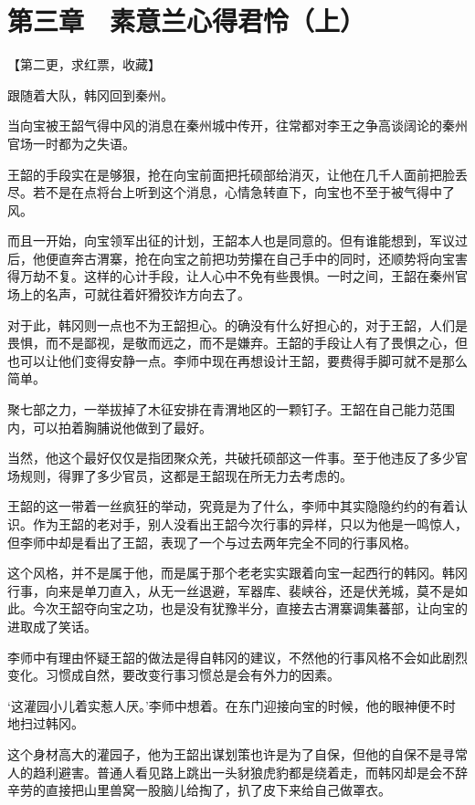 \section{第三章　素意兰心得君怜（上）}

【第二更，求红票，收藏】

跟随着大队，韩冈回到秦州。

当向宝被王韶气得中风的消息在秦州城中传开，往常都对李王之争高谈阔论的秦州官场一时都为之失语。

王韶的手段实在是够狠，抢在向宝前面把托硕部给消灭，让他在几千人面前把脸丢尽。若不是在点将台上听到这个消息，心情急转直下，向宝也不至于被气得中了风。

而且一开始，向宝领军出征的计划，王韶本人也是同意的。但有谁能想到，军议过后，他便直奔古渭寨，抢在向宝之前把功劳攥在自己手中的同时，还顺势将向宝害得万劫不复。这样的心计手段，让人心中不免有些畏惧。一时之间，王韶在秦州官场上的名声，可就往着奸猾狡诈方向去了。

对于此，韩冈则一点也不为王韶担心。的确没有什么好担心的，对于王韶，人们是畏惧，而不是鄙视，是敬而远之，而不是嫌弃。王韶的手段让人有了畏惧之心，但也可以让他们变得安静一点。李师中现在再想设计王韶，要费得手脚可就不是那么简单。

聚七部之力，一举拔掉了木征安排在青渭地区的一颗钉子。王韶在自己能力范围内，可以拍着胸脯说他做到了最好。

当然，他这个最好仅仅是指团聚众羌，共破托硕部这一件事。至于他违反了多少官场规则，得罪了多少官员，这都是王韶现在所无力去考虑的。

王韶的这一带着一丝疯狂的举动，究竟是为了什么，李师中其实隐隐约约的有着认识。作为王韶的老对手，别人没看出王韶今次行事的异样，只以为他是一鸣惊人，但李师中却是看出了王韶，表现了一个与过去两年完全不同的行事风格。

这个风格，并不是属于他，而是属于那个老老实实跟着向宝一起西行的韩冈。韩冈行事，向来是单刀直入，从无一丝退避，军器库、裴峡谷，还是伏羌城，莫不是如此。今次王韶夺向宝之功，也是没有犹豫半分，直接去古渭寨调集蕃部，让向宝的进取成了笑话。

李师中有理由怀疑王韶的做法是得自韩冈的建议，不然他的行事风格不会如此剧烈变化。习惯成自然，要改变行事习惯总是会有外力的因素。

‘这灌园小儿着实惹人厌。’李师中想着。在东门迎接向宝的时候，他的眼神便不时地扫过韩冈。

这个身材高大的灌园子，他为王韶出谋划策也许是为了自保，但他的自保不是寻常人的趋利避害。普通人看见路上跳出一头豺狼虎豹都是绕着走，而韩冈却是会不辞辛劳的直接把山里兽窝一股脑儿给掏了，扒了皮下来给自己做罩衣。

